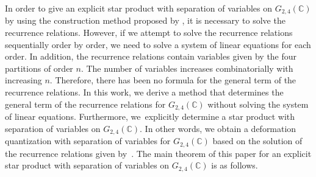 \documentclass[10pt,a4paper]{amsart}
\numberwithin{equation}{section}
\begin{document}
In order to give an explicit star product with separation of variables on $G_{2,4}(\mathbb{C})$ by using the construction method proposed by \cite{HS1,HS2}, it is necessary to solve the recurrence relations. However, if we attempt to solve the recurrence relations sequentially order by order, we need to solve a system of linear equations for each order. In addition, the recurrence relations contain variables given by the four partitions of order $n$. The number of variables increases combinatorially with increasing $n$. Therefore, there has been no formula for the general term of the recurrence relations. In this work, we derive a method that
determines the general term of the recurrence relations for $G_{2,4}(\mathbb{C})$ without solving the system of linear equations. Furthermore, we~explicitly determine a star product with separation of variables on $G_{2,4}(\mathbb{C})$.
In other words, we obtain a deformation quantization with separation of variables for $G_{2,4}(\mathbb{C})$ based on the solution of the recurrence relations given by~\cite{HS1,HS2}. The main theorem of this paper for an explicit star product with separation of variables on $G_{2,4}(\mathbb{C})$ is as follows.
\end{document}
